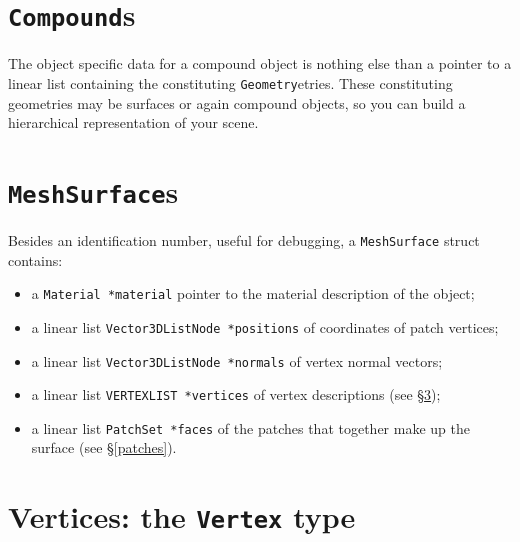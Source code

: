 \documentclass[11pt]{report}
\begin{document}
\section{{\tt Compound}s}
\label{compound}

The object specific data for a compound object is nothing else than
a pointer to a linear list containing the constituting {\tt Geometry}etries.
These constituting geometries may be surfaces or again compound objects, so
you can build a hierarchical representation of your scene.

\section{{\tt MeshSurface}s}
\label{surface}

Besides an identification number, useful for debugging, a {\tt MeshSurface}
struct contains:
\begin{itemize}
\item   a {\tt Material *material} pointer to the material description
  of the object;
\item   a linear list {\tt Vector3DListNode *positions} of coordinates of patch
  vertices;
\item   a linear list {\tt Vector3DListNode *normals} of vertex normal vectors;
\item   a linear list {\tt VERTEXLIST *vertices} of vertex descriptions
  (see \S\ref{vertices});
\item   a linear list {\tt PatchSet *faces} of the patches that together
  make up the surface (see \S\ref{patches}).
\end{itemize}

\section{Vertices: the {\tt Vertex} type}
\label{vertices}
\end{document}
